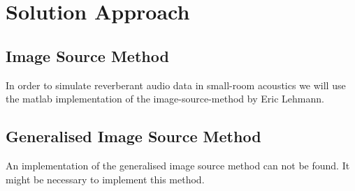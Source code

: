 \chapter{Solution Approach}
\label{chap:approach}

\section{Image Source Method}
In order to simulate reverberant audio data in small-room acoustics we will use the matlab implementation of the image-source-method by Eric Lehmann.\cite{Lehmann}

\section{Generalised Image Source Method}
An implementation of the generalised image source method can not be found. It might be necessary to implement this method.